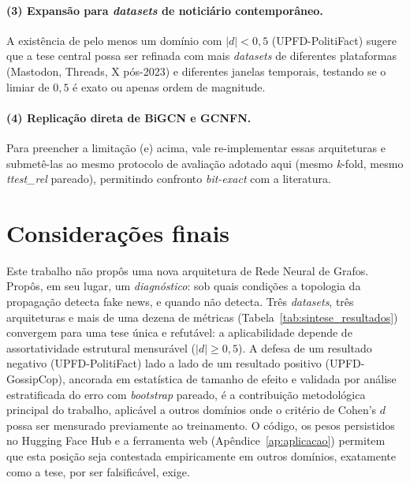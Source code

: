 \paragraph{(3) Expans\~ao para \emph{datasets} de notici\'ario
contempor\^aneo.} A exist\^encia de pelo menos um dom\'inio com $|d| <
0{,}5$ (UPFD-PolitiFact) sugere que a tese central possa ser refinada
com mais \emph{datasets} de diferentes plataformas (Mastodon, Threads,
X p\'os-2023) e diferentes janelas temporais, testando se o limiar de
$0{,}5$ \'e exato ou apenas ordem de magnitude.

\paragraph{(4) Replica\c{c}\~ao direta de BiGCN e GCNFN.} Para preencher
a limita\c{c}\~ao (e) acima, vale re-implementar essas arquiteturas e
submet\^e-las ao mesmo protocolo de avalia\c{c}\~ao adotado aqui (mesmo
\emph{k}-fold, mesmo \emph{ttest\_rel} pareado), permitindo confronto
\emph{bit-exact} com a literatura.

\section{Considera\c{c}\~oes finais}
\label{sec:final}

Este trabalho n\~ao prop\^os uma nova arquitetura de Rede Neural de
Grafos. Prop\^os, em seu lugar, um \emph{diagn\'ostico}: sob quais
condi\c{c}\~oes a topologia da propaga\c{c}\~ao detecta fake news, e
quando n\~ao detecta. Tr\^es \emph{datasets}, tr\^es arquiteturas e mais
de uma dezena de m\'etricas (Tabela~\ref{tab:sintese_resultados})
convergem para uma tese \'unica e refut\'avel: a aplicabilidade depende
de assortatividade estrutural mensur\'avel ($|d| \geq 0{,}5$). A defesa
de um resultado negativo (UPFD-PolitiFact) lado a lado de um resultado
positivo (UPFD-GossipCop), ancorada em estat\'istica de tamanho de
efeito e validada por an\'alise estratificada do erro com \emph{bootstrap}
pareado, \'e a contribui\c{c}\~ao metodol\'ogica principal do trabalho, aplic\'avel a outros
dom\'inios onde o crit\'erio de Cohen's $d$ possa ser mensurado previamente
ao treinamento. O c\'odigo, os
pesos persistidos no Hugging Face Hub e a ferramenta web
(Ap\^endice~\ref{ap:aplicacao}) permitem que esta posi\c{c}\~ao seja
contestada empiricamente em outros dom\'inios, exatamente como a
tese, por ser falsific\'avel, exige.
